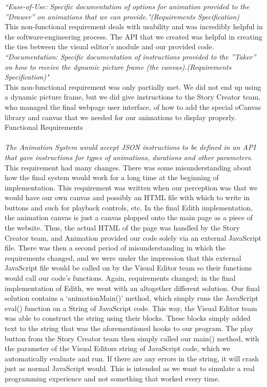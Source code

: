 \documentclass[12pt]{article}
\begin{document}
\textit{``Ease-of-Use: Specific documentation of options for animation provided to the ”Drawer” on animations that we can provide."(Requirements Specification)}\\
This non-functional requirement deals with usability and was incredibly helpful in the software-engineering process. The API that we created was helpful in creating the ties between the visual editor’s module and our provided code.
\textit{``Documentation: Specific documentation of instructions provided to the ”Taker” on how to receive the dynamic picture frame (the canvas).(Requirements Specification)"}\\
This non-functional requirement was only partially met. We did not end up using a dynamic picture frame, but we did give instructions to the Story Creator team, who managed the final webpage user interface, of how to add the special oCanvas library and canvas that we needed for our animations to display properly.\\


\large Functional Requirements\\\\
\textit{The Animation System would accept JSON instructions to be defined in an API that gave instructions for types of animations, durations and other parameters.}\\
This requirement had many changes. There was some misunderstanding about how the final system would work for a long time at the beginning of implementation. This requirement was written when our perception was that we would have our own canvas and possibly an HTML file with which to write in buttons and such for playback controls, etc. In the final Edith implementation, the animation canvas is just a canvas plopped onto the main page as a piece of the website. Thus, the actual HTML of the page was handled by the Story Creator team, and Animation provided our code solely via an external JavaScript file. There was then a second period of misunderstanding in which the requirements changed, and we were under the impression that this external JavaScript file would be called on by the Visual Editor team so their functions would call our code's functions. Again, requirements changed; in the final implementation of Edith, we went with an altogether different solution. Our final solution contains a `animationMain()' method, which simply runs the JavaScript eval() function on a String of JavaScript code. This way, the Visual Editor team was able to construct the string using their blocks. These blocks simply added text to the string that was the aforementioned hooks to our program. The play button from the Story Creator team then simply called our main() method, with the parameter of the Visual Editors string of JavaScript code, which we automatically evaluate and run. If there are any errors in the string, it will crash just as normal JavaScript would. This is intended as we want to simulate a real programming experience and not something that worked every time. \\
\end{document}
